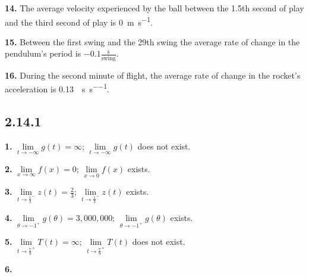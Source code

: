 \documentclass[12pt,]{book}
\theoremstyle{plain}
\theoremstyle{definition}
\numberwithin{equation}{section}
\newcommand{\fe}[2]{#1\mathopen{}\left(#2\right)\mathclose{}}
\begin{document}
                \par\smallskip
\noindent\textbf{14.}\quad{}
                    The average velocity experienced by the ball between the 1.5th second of play and the third second of play is \SI{0}{\meter\per\second}.%

                \par\smallskip
\noindent\textbf{15.}\quad{}
                    Between the first swing and the 29th swing the average rate of change in the pendulum's period is \(-0.1\frac{\text{s}}{\text{swing}}\).%

                \par\smallskip
\noindent\textbf{16.}\quad{}
                    During the second minute of flight, the average rate of change in the rocket's acceleration is \SI{0.13}{\mileperhour\per\second\per\second}.%

                \par\smallskip
\subsection*{2.14.1 }
\noindent\textbf{1.}\quad{}
                    \(\lim\limits_{t\to-\infty}\fe{g}{t}=\infty\); \(\lim\limits_{t\to-\infty}\fe{g}{t}\) does not exist.%

                \par\smallskip
\noindent\textbf{2.}\quad{}
                    \(\lim\limits_{x\to\infty}\fe{f}{x}=0\); \(\lim\limits_{x\to0}\fe{f}{x}\) exists.%

                \par\smallskip
\noindent\textbf{3.}\quad{}
                    \(\lim\limits_{t\to\frac{1}{3}^{-}}\fe{z}{t}=\frac{2}{3}\); \(\lim\limits_{t\to\frac{1}{3}^{-}}\fe{z}{t}\) exists.%

                \par\smallskip
\noindent\textbf{4.}\quad{}
                    \(\lim\limits_{\theta\to-1^{+}}\fe{g}{\theta}=3{,}000{,}000\); \(\lim\limits_{\theta\to-1^{+}}\fe{g}{\theta}\) exists.%

                \par\smallskip
\noindent\textbf{5.}\quad{}
                    \(\lim\limits_{t\to\frac{7}{9}^{+}}\fe{T}{t}=\infty\); \(\lim\limits_{t\to\frac{7}{9}^{+}}\fe{T}{t}\) does not exist.%

                \par\smallskip
\noindent\textbf{6.}\quad{}
                {
}
\end{document}
